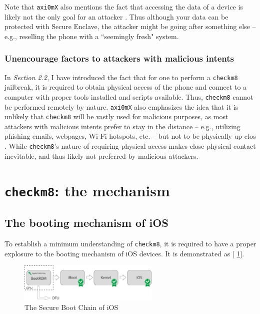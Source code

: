 \documentclass[10pt]{article}
\newcommand{\inlinecode}{\texttt}
\begin{document}
Note that \inlinecode{axi0mX} also mentions the fact that accessing the data of a device is likely not the only goal for an attacker \cite{cite:3}. Thus although your data can be protected with Secure Enclave, the attacker might be going after something else -- e.g., reselling the phone with a ``seemingly fresh" system.

\subsubsection{Unencourage factors to attackers with malicious intents}
In \textit{Section 2.2}, I have introduced the fact that for one to perform a \inlinecode{checkm8} jailbreak, it is required to obtain physical access of the phone and connect to a computer with proper tools installed and scripts available. Thus, \inlinecode{checkm8} cannot be performed remotely by nature. \inlinecode{axi0mX} also emphasizes the idea that it is unlikely that \inlinecode{checkm8} will be vastly used for malicious purposes, as most attackers with malicious intents prefer to stay in the distance -- e.g., utilizing phishing emails, webpages, Wi-Fi hotspots, etc. -- but not to be physically up-clos \cite{cite:3}. While \inlinecode{checkm8}'s nature of requiring physical access makes close physical contact inevitable, and thus likely not preferred by malicious attackers.

\section{\inlinecode{checkm8}: the mechanism}
\subsection{The booting mechanism of iOS}

To establish a minimum understanding of \inlinecode{checkm8}, it is required to have a proper explosure to the booting mechanism of iOS devices. It is demonstrated as [\figurename{ \ref{figure_1}}].
\begin{figure}[!ht]
    \centering
    \includegraphics[width = 0.6\textwidth]{figure_1}
    \caption{The Secure Boot Chain of iOS \protect\cite{cite:4}}
    \label{figure_1}
\end{figure}
\end{document}
